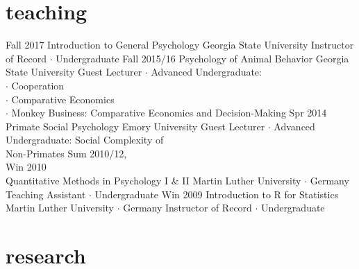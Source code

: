 \documentclass[]{friggeri-cv}
\begin{document}
\section{teaching}

\begin{entrylist}
  \entry
    {Fall 2017}
    {Introduction to General Psychology}
    {Georgia State University}
    {Instructor of Record $\cdot$ Undergraduate}
  \entry
    {Fall 2015/16}
    {Psychology of Animal Behavior}
    {Georgia State University}
    {Guest Lecturer $\cdot$ Advanced Undergraduate:\\ 
    $\cdot$ Cooperation\\
    $\cdot$ Comparative Economics\\
    $\cdot$ Monkey Business: Comparative Economics and Decision-Making}
  \entry
    {Spr 2014}
    {Primate Social Psychology}
    {Emory University}
    {Guest Lecturer $\cdot$ Advanced Undergraduate: Social Complexity of\\ Non-Primates}
  \entry
    {Sum 2010/12,\\Win 2010\\[-.85cm]}
    {Quantitative Methods in Psychology I \& II}
    {Martin Luther University $\cdot$ Germany}
    {Teaching Assistant $\cdot$ Undergraduate}
  \entry
    {Win 2009}
    {Introduction to R for Statistics}
    {Martin Luther University $\cdot$ Germany}
    {Instructor of Record $\cdot$ Undergraduate}
\end{entrylist}


\section{research}
\end{document}

